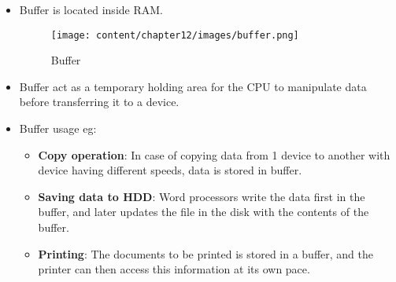 \setlength{\columnsep}{3pt}
\begin{flushleft}

\begin{itemize}
	\item Buffer is located inside RAM.
	\begin{figure}[h!]
		\centering
		\texttt{[image: content/chapter12/images/buffer.png]}
		\caption{Buffer}
		\label{fig:buffer}
	\end{figure}
	\item Buffer act as a temporary holding area for the CPU to manipulate data before transferring it to a device. 
	\item Buffer usage eg:
	\begin{itemize}
		\item \textbf{Copy operation}: In case of copying data from 1 device to another with device having different speeds, data is stored in buffer.
		\item \textbf{Saving data to HDD}: Word processors write the data first in the buffer, and later updates the file in the disk with the contents of the buffer.
		\item \textbf{Printing}: The documents to be printed is stored in a buffer, and the printer can then access this information at its own pace.
	\end{itemize}
\end{itemize}



\end{flushleft}

\newpage


